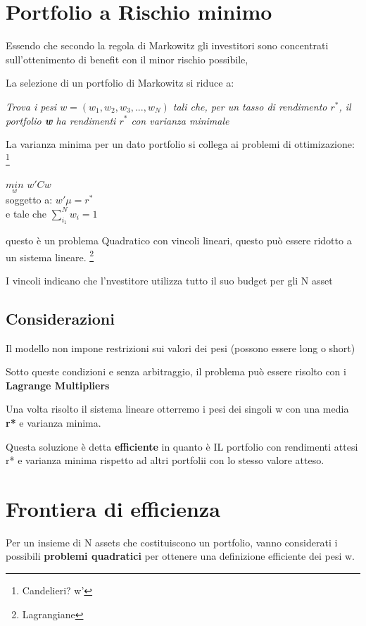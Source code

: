 \documentclass[a4paper,11pt]{report}
\begin{document}
{\newpage

\section{Portfolio a Rischio minimo}
	Essendo che secondo la regola di Markowitz gli investitori sono concentrati sull'ottenimento di benefit con il minor rischio 			possibile,

	La selezione di un portfolio di Markowitz si riduce a:
\begin{center}
	\emph{ Trova i pesi  $w=(w_1,w_2,w_3,...,w_N)$ tali che, per un tasso di rendimento $r^*$, il portfolio \textbf{w} ha rendimenti 		$r^*$  con varianza minimale }
\end{center}
	La varianza minima per un dato portfolio si collega ai problemi di ottimizazione: \footnote{Candelieri? w'}
\begin{center}
	$ \underset{w}{min}$ $ w' Cw $ \\
	soggetto a: $ w' \mu = r^* $ \\
 	e tale che $ \sum\limits_{i_1}^{N} w_i=1 $
\end{center}
	questo è un problema Quadratico con vincoli lineari, questo può essere ridotto a un sistema lineare. \footnote{Lagrangiane}

	I vincoli indicano che l'nvestitore utilizza tutto il suo budget per gli N asset
\subsection{Considerazioni}
	Il modello non impone restrizioni sui valori dei pesi (possono essere long o short)

	Sotto queste condizioni e senza arbitraggio, il problema può essere risolto con i \textbf{Lagrange Multipliers}

	Una volta risolto il sistema lineare otterremo i pesi dei singoli w con una media \textbf{r*} e varianza minima.

	Questa soluzione è detta \textbf{efficiente} in quanto è IL portfolio con rendimenti attesi r* e varianza minima rispetto ad altri 			portfolii con lo stesso valore atteso.
\section{Frontiera di efficienza}
	Per un insieme di N assets che costituiscono un portfolio, vanno considerati i possibili \textbf{problemi quadratici} per 			ottenere
	una definizione efficiente dei pesi w. \newline

}
\end{document}
